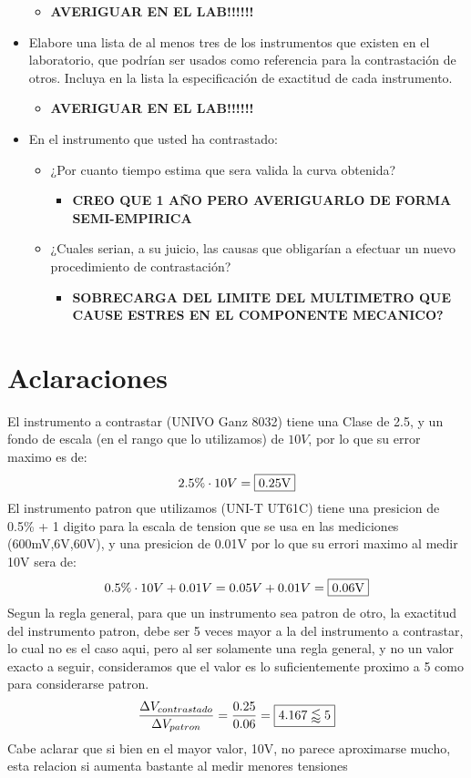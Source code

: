 \begin{itemize}
  \begin{itemize} 
    \item \textbf{AVERIGUAR EN EL LAB!!!!!!}
  \end{itemize}
  \item Elabore una lista de al menos tres de los instrumentos que existen en el laboratorio, que podrían ser usados como referencia para la contrastación de otros. Incluya en la lista la especificación de exactitud de cada instrumento.
  \begin{itemize}
    \item \textbf{AVERIGUAR EN EL LAB!!!!!!}
  \end{itemize}
  \item En el instrumento que usted ha contrastado:
  \begin{itemize}
    \item ¿Por cuanto tiempo estima que sera valida la curva obtenida?
      \begin{itemize}
        \item \textbf{CREO QUE 1 AÑO PERO AVERIGUARLO DE FORMA SEMI-EMPIRICA}
      \end{itemize}
    \item ¿Cuales serian, a su juicio, las causas que obligarían a efectuar un nuevo procedimiento de contrastación?
      \begin{itemize}
        \item \textbf{SOBRECARGA DEL LIMITE DEL MULTIMETRO QUE CAUSE ESTRES EN EL COMPONENTE MECANICO?}
      \end{itemize}
  \end{itemize}
\end{itemize}

\section{Aclaraciones}
El instrumento a contrastar (UNIVO Ganz 8032) tiene una Clase de 2.5, y un fondo de escala (en el rango que lo utilizamos) de $10V$, por lo que su error maximo es de:
$$2.5\% \cdot 10V = \framebox{0.25V}$$
El instrumento patron que utilizamos (UNI-T UT61C) tiene una presicion de 0.5\% + 1 digito para la escala de tension que se usa en las mediciones (600mV,6V,60V), y una presicion de 0.01V por lo que su errori maximo al medir 10V sera de:
$$0.5\% \cdot 10V + 0.01V = 0.05V + 0.01V = \framebox{0.06V}$$
Segun la regla general, para que un instrumento sea patron de otro, la exactitud del instrumento patron, debe ser 5 veces mayor a la del instrumento a contrastar, lo cual no es el caso aqui, pero al ser solamente una regla
general, y no un valor exacto a seguir, consideramos que el valor es lo suficientemente proximo a 5 como para considerarse patron.
$$\dfrac{\Delta V_{contrastado}}{\Delta V_{patron}} = \dfrac{0.25}{0.06} = \framebox{$4.167 \lessapprox 5$}$$
Cabe aclarar que si bien en el mayor valor, 10V, no parece aproximarse mucho, esta relacion si aumenta bastante al medir menores tensiones

